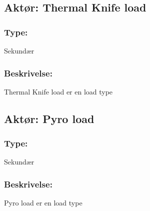 \begin{framed}
	\subsection{Aktør: Thermal Knife load}
	\subsubsection*{Type:}
	Sekundær
	
	\subsubsection*{Beskrivelse:}
	Thermal Knife load er en load type
\end{framed}

\begin{framed}
	\subsection{Aktør: Pyro load}
	\subsubsection*{Type:}
	Sekundær
	
	\subsubsection*{Beskrivelse:}
	Pyro load er en load type
\end{framed}

\clearpage

	

